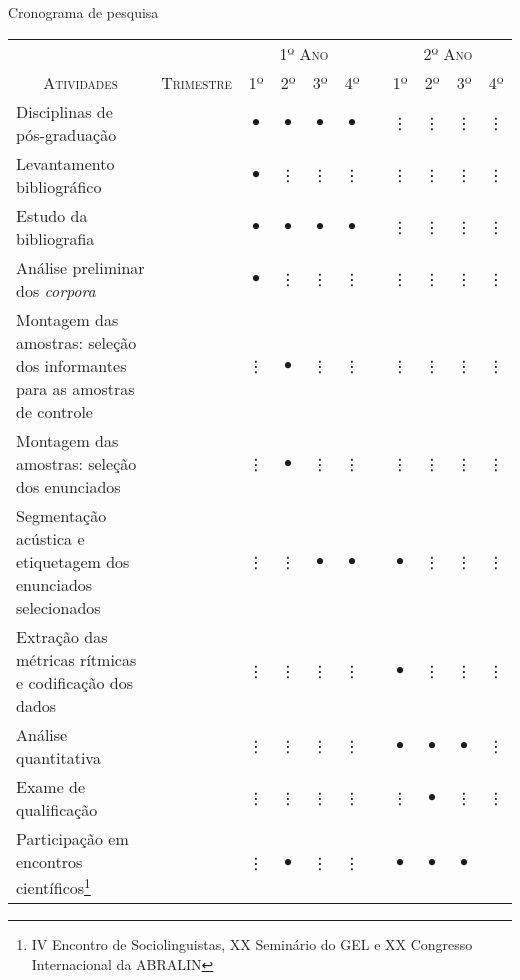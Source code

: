 \documentclass[
		a4paper,	%
		12pt,		%
		]{article}	%
\begin{document}
	\begin{quadro}[h!]
		\vspace{1em}
		\caption{\rmfamily Cronograma de pesquisa}
		\vspace{.5em}
		\label{tab-crono}
		\begin{tabular}{m{.44\linewidth}cccccccccc}
			&& \multicolumn{4}{c}{\scshape\normalsize 1º Ano} &&
			\multicolumn{4}{c}{\scshape\normalsize 2º Ano} \\
			\cline{3-6}\cline{8-11}
			\multicolumn{1}{c}{\scshape\normalsize Atividades}&
			\scshape\normalsize Trimestre &\scshape\normalsize  1º
			&\scshape\normalsize  2º &\scshape\normalsize  3º
			&\scshape\normalsize  4º &\scshape\normalsize  &\scshape\normalsize
			1º &\scshape\normalsize  2º &\scshape\normalsize  3º &\scshape\normalsize  4º \\
			\hline
			\hline
			Disciplinas de pós-graduação
			&&$\bullet$&$\bullet$&$\bullet$&$\bullet$ &&\vdots&\vdots&\vdots &\vdots \\  
			\rowcolor{cinza1}
			Levantamento bibliográfico
			&&$\bullet$&\vdots&\vdots&\vdots&&\vdots&\vdots&\vdots&\vdots \\  
			Estudo da bibliografia &&$\bullet$&$\bullet$&$\bullet$&$\bullet$&&\vdots&\vdots&\vdots &\vdots \\  
			\rowcolor{cinza1}
			Análise preliminar dos \emph{corpora}
			&&$\bullet$&\vdots&\vdots&\vdots&&\vdots&\vdots&\vdots &\vdots \\  
			Montagem das amostras: seleção dos informantes para as amostras de
			controle &&\vdots&$\bullet$&\vdots&\vdots&&\vdots&\vdots&\vdots &\vdots \\  
			\rowcolor{cinza1}
			Montagem das amostras: seleção dos enunciados &&\vdots&$\bullet$&\vdots&\vdots&&\vdots&\vdots&\vdots &\vdots \\  
			Segmentação acústica e etiquetagem dos enunciados selecionados
			&&\vdots&\vdots&$\bullet$&$\bullet$&&$\bullet$&\vdots&\vdots &\vdots \\  	
			\rowcolor{cinza1}
			Extração das métricas rítmicas e codificação dos dados &&\vdots&\vdots&\vdots&\vdots&&$\bullet$&\vdots&\vdots &\vdots \\  
			Análise quantitativa &&\vdots&\vdots&\vdots&\vdots&&$\bullet$&$\bullet$&$\bullet$ &\vdots \\  
			\rowcolor{cinza1}
			Exame de qualificação &&\vdots&\vdots&\vdots&\vdots&&\vdots&$\bullet$&\vdots &\vdots \\  
			Participação em encontros científicos\footnote{IV Encontro de Sociolinguistas, XX Seminário do GEL e XX Congresso Internacional da ABRALIN} &&\vdots&$\bullet$&\vdots&\vdots&&$\bullet$&$\bullet$&$\bullet$

\end{tabular}
\end{quadro}
\end{document}

